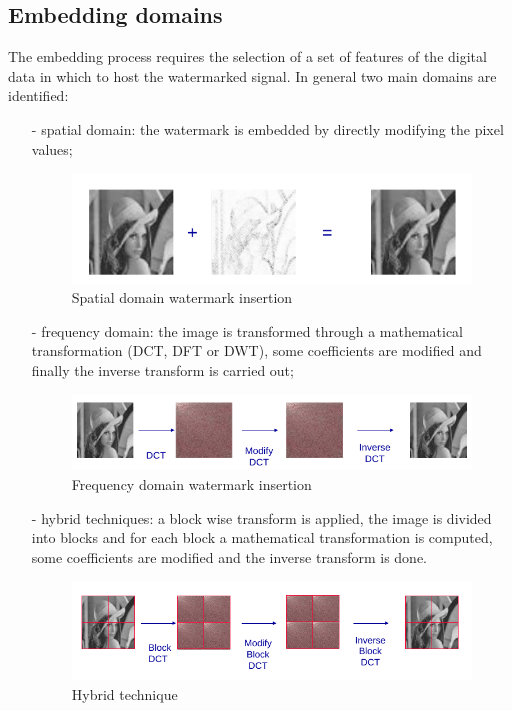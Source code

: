 \subsection{Embedding domains}
The embedding process requires the selection of a set of features of the digital data in which to host the watermarked signal. In general two main domains are identified:
\begin{itemize}
\item[-] spatial domain: the watermark is embedded by directly modifying the pixel values;
\begin{figure}[h!]
\centering
\includegraphics[width=1\textwidth]{./img/domain1.png}
\caption{\small{Spatial domain watermark insertion}}
\label{fig:dom1}
\end{figure}
\item[-] frequency domain: the image is transformed through a mathematical transformation (DCT, DFT or DWT), some coefficients are modified and finally the inverse transform is carried out;
\begin{figure}[h!]
\centering
\includegraphics[width=1\textwidth]{./img/domain2.png}
\caption{\small{Frequency domain watermark insertion}}
\label{fig:dom2}
\end{figure}
\item[-] hybrid techniques: a block wise transform is applied, the image is divided
into blocks and for each block a mathematical transformation is computed, some coefficients are modified and the inverse transform is done.
\begin{figure}[h!]
\centering
\includegraphics[width=1\textwidth]{./img/domain3.png}
\caption{\small{Hybrid technique}}
\label{fig:dom3}
\end{figure}
\end{itemize}

